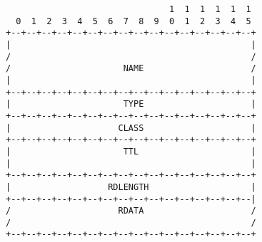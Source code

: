 \documentclass{article}
\begin{document}
\begin{center}
\begin{varwidth}{\textwidth}
\begin{verbatim}
                                1  1  1  1  1  1
  0  1  2  3  4  5  6  7  8  9  0  1  2  3  4  5
+--+--+--+--+--+--+--+--+--+--+--+--+--+--+--+--+
|                                               |
/                                               /
/                      NAME                     /
|                                               |
+--+--+--+--+--+--+--+--+--+--+--+--+--+--+--+--+
|                      TYPE                     |
+--+--+--+--+--+--+--+--+--+--+--+--+--+--+--+--+
|                     CLASS                     |
+--+--+--+--+--+--+--+--+--+--+--+--+--+--+--+--+
|                      TTL                      |
|                                               |
+--+--+--+--+--+--+--+--+--+--+--+--+--+--+--+--+
|                   RDLENGTH                    |
+--+--+--+--+--+--+--+--+--+--+--+--+--+--+--+--|
/                     RDATA                     /
/                                               /
+--+--+--+--+--+--+--+--+--+--+--+--+--+--+--+--+
\end{verbatim}
\end{varwidth}
\end{center}
\end{document}
